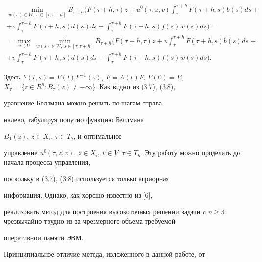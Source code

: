 \begin{multline}


\min_{w(s) \in W,\ s \in [\tau, \tau+h]}


B_{\tau+h}\bigg(F(\tau+h,\tau)z+u^0(\tau,z,v)


\int_{\tau}^{\tau+h}F(\tau+h,s)b(s)ds+ \\


%


+v\int_{\tau}^{\tau+h}F(\tau+h,s)d(s)ds+


\int_{\tau}^{\tau+h}F(\tau+h,s)f(s)w(s)ds\bigg)= \\


%


=\max_{u \in U}\;\min_{w(s) \in W,\ s \in [\tau, \tau+h]}


B_{\tau+h}\bigg(F(\tau+h,\tau)z+ u


\int_{\tau}^{\tau+h}F(\tau+h,s)b(s)ds+ \\


%


+v\int_{\tau}^{\tau+h}F(\tau+h,s)d(s)ds+


\int_{\tau}^{\tau+h}F(\tau+h,s)f(s)w(s)ds\bigg).


\end{multline}


Здесь $F(t,s)=F(t)F^{-1}(s)$, $\Dot F=A(t)F$, $F(0)=E$, $X_{\tau}=\{z \in


R^n:B_{\tau}(z)\ne -\infty \}$. Как видно из (3.7), (3.8),


уравнение Беллмана можно решить по шагам справа


налево, табулируя попутно функцию Беллмана


$B_{1}(z)$, $z \in X_{\tau}$, $\tau \in T_{h}$, и оптимальное


управление $u^0(\tau,z,v)$, $z \in X_{\tau}$, $v \in V$, $\tau \in


T_{h}$. Эту работу можно проделать до начала процесса управления,


поскольку в (3.7), (3.8) используется только априорная


информация. Однако, как хорошо известно из [6],


реализовать метод для построения высокоточных решений задачи c $n


\ge 3$ чрезвычайно трудно из-за чрезмерного объема требуемой


оперативной памяти ЭВМ.





Принципиальное отличие метода, изложенного в данной работе, от


